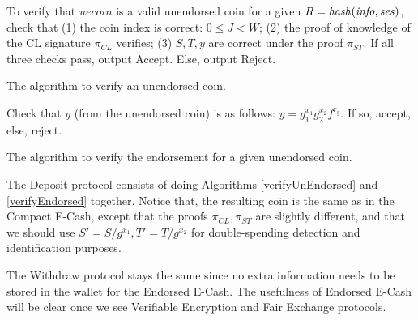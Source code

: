 \begin{algorithm}[H]\label{verifyUnEndorsed}
\dontprintsemicolon

\BlankLine
\Indp
  To verify that $\mathit{uecoin}$ is a valid unendorsed coin for a given $R=\mathit{hash}(\mathit{info},\mathit{ses})$, check that (1) the coin index is correct: $0 \leq J < W$; (2) the proof of knowledge of the CL signature $\pi_{CL}$ verifies; (3) $S,T,y$ are correct under the proof $\pi_{ST}$. If all three checks pass, output Accept. Else, output Reject.
\Indm

\caption{The algorithm to verify an unendorsed coin.}
\end{algorithm}

\begin{algorithm}[H]\label{verifyEndorsed}
\dontprintsemicolon

\BlankLine
\Indp
Check that $y$ (from the unendorsed coin) is as follows: $y=g_1^{x_1}g_2^{x_2}f^{r_y}$. If so, accept, else, reject.
\Indm

\caption{The algorithm to verify the endorsement for a given unendorsed coin.}
\end{algorithm}


The Deposit protocol consists of doing Algorithms \ref{verifyUnEndorsed} and \ref{verifyEndorsed} together. Notice that, the resulting coin is the same as in the Compact E-Cash, except that the proofs $\pi_{CL},\pi_{ST}$ are slightly different, and that we should use $S' = S / g^{x_1}, T' = T / g^{x_2}$ for double-spending detection and identification purposes.

The Withdraw protocol stays the same since no extra information needs to be stored in the wallet for the Endorsed E-Cash. The usefulness of Endorsed E-Cash will be clear once we see Verifiable Encryption and Fair Exchange protocols.





